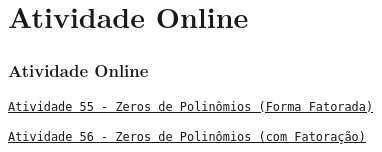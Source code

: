 \section{Atividade Online}
\begin{frame}
\frametitle{Atividade Online} 

\href{https://pt.khanacademy.org/math/algebra2/polynomial-functions/zeros-of-polynomials-and-their-graphs/e/using-zeros-to-graph-polynomials}
{{\tt Atividade 55 - Zeros de Polinômios (Forma Fatorada)}}

\href{https://pt.khanacademy.org/math/algebra2/x2ec2f6f830c9fb89:poly-graphs/x2ec2f6f830c9fb89:poly-zeros/e/find-the-zeros-of-polynomials}
{{\tt Atividade 56 - Zeros de Polinômios (com Fatoração)}}


\end{frame}


